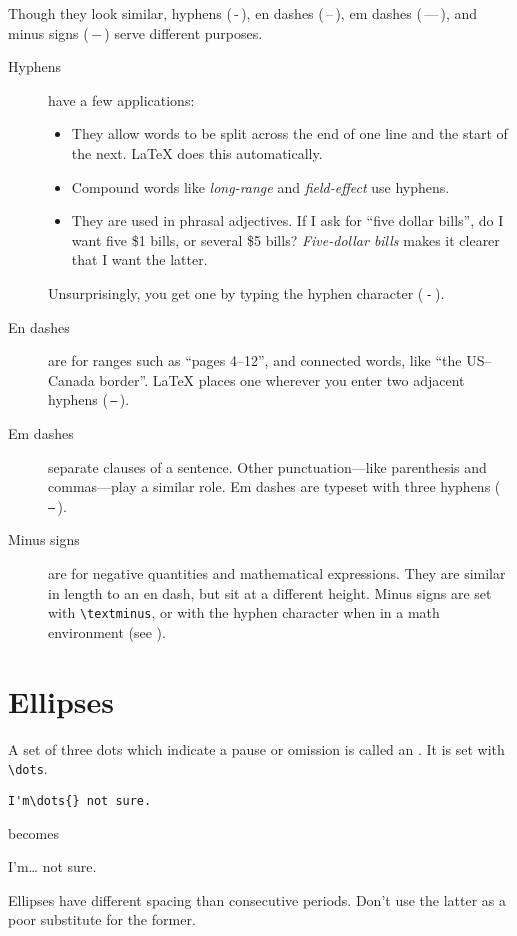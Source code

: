 Though they look similar,
hyphens (\,-\,), en dashes (\,--\,),
em dashes (\,---\,), and minus signs (\,$-$\,)
serve different purposes.
\begin{description}
\item[Hyphens] have a few applications:
    \begin{itemize}[leftmargin=*]
    \item They allow words to be split across the end of one line and the
        start of the next.
        \LaTeX{} does this automatically.
    \item Compound words like \emph{long-range} and \emph{field-effect}
        use hyphens.
    \item They are used in phrasal adjectives.
        If I ask for ``five dollar bills''\quotekern,
        do I want five \$1 bills, or several \$5 bills?
        \emph{Five-dollar bills} makes it clearer that I want the latter.
    \end{itemize}
    Unsurprisingly, you get one by typing the hyphen character (\,\texttt{-}\,).

\item[En dashes] are for ranges such as ``pages 4--12''\quotekern,
    and connected words, like ``the \mbox{US--Canada} border''\quotekern.
    \LaTeX{} places one wherever you enter two adjacent hyphens
    (\,\texttt{--}\,).

\item[Em dashes] separate clauses of a sentence.
    Other punctuation---like parenthesis and commas---play a similar
    role.
    Em dashes are typeset with three hyphens (\,\texttt{---}\,).

\item[Minus signs] are for negative quantities and
    mathematical expressions.
    They are similar in length to an en dash,
    but sit at a different height.
    Minus signs are set with \verb|\textminus|,
    or with the hyphen character
    when in a math environment (see ).
\end{description}

\section{Ellipses}

A set of three dots which indicate a pause or omission is called an
.
It is set with \verb|\dots|.
\begin{leftfigure}
\begin{lstlisting}
I'm\dots{} not sure.
\end{lstlisting}
\end{leftfigure}
becomes
\begin{leftfigure}
\lm%
I'm\dots{} not sure.
\end{leftfigure}
Ellipses have different spacing than consecutive periods.
Don't use the latter as a poor substitute for the former.

